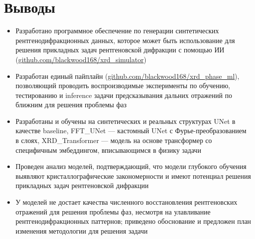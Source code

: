 \section{Выводы}

\begin{itemize}
\item Разработано программное обеспечение по генерации синтетических рентгенодифракционных данных, которое может быть использование для решения прикладных задач рентгеновской дифракции с помощью ИИ (\url{github.com/blackwood168/xrd_simulator})

\item Разработан единый пайплайн (\url{github.com/blackwood168/xrd_phase_ml}), позволяющий проводить воспроизводимые эксперименты по обучению, тестированию и inference задачи предсказывания дальних отражений по ближним для решения проблемы фаз

\item Разработаны и обучены на синтетических и реальных структурах UNet в качестве baseline, FFT\_UNet --- кастомный UNet с Фурье-преобразованием в слоях, XRD\_Transformer --- модель на основе трансформер со специфичным эмбеддингом, вписывающимся в физику задачи

\item Проведен анализ моделей, подтверждающий, что модели глубокого обучения выявляют кристаллографические закономерности и имеют потенциал решения прикладных задач рентгеновской дифракции

\item У моделей не достает качества численного восстановления рентгеновских отражений для решения проблемы фаз, несмотря на улавливание рентгенодифракционных паттернов; приведено обоснование и предложен план изменения методологии для решения задачи

\end{itemize}

